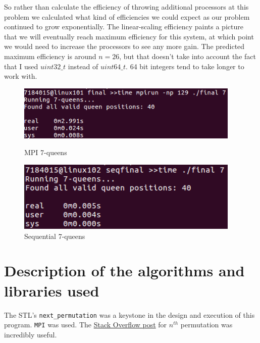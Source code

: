 \documentclass{article}
\begin{document}
So rather than calculate the efficiency of throwing additional processors at 
this problem we calculated what kind of efficiencies we could expect as our 
problem continued to grow exponentially. The linear-scaling efficiency paints a 
picture that we will eventually reach maximum efficiency for this system, at 
which point we would need to increase the processors to see any more gain. The 
predicted maximum efficiency is around $n=26$, but that doesn't take into 
account the fact that I used $uint32\_t$ instead of $uint64\_t$. 64 bit integers 
tend to take longer to work with.

\begin{figure}[h]
    \centering
    \begin{minipage}{0.49\textwidth}
        \centering
        \includegraphics[width=0.95\textwidth]{images/MPI_7}
        \caption{MPI 7-queens}
        \label{fig:mpi7}
    \end{minipage}\hfill
    \begin{minipage}{0.49\textwidth}
        \centering
        \includegraphics[width=0.95\textwidth]{images/MPI_2_7}
        \caption{Sequential 7-queens}
        \label{fig:seq7}
    \end{minipage}
\end{figure}


\section{Description of the algorithms and libraries used}
The STL's \verb|next_permutation| was a keystone in the design and execution of 
this program. \verb|MPI| was used. The 
\href{https://stackoverflow.com/a/7919887}{Stack Overflow post} for $n^{th}$ 
permutation was incredibly useful.
\end{document}
